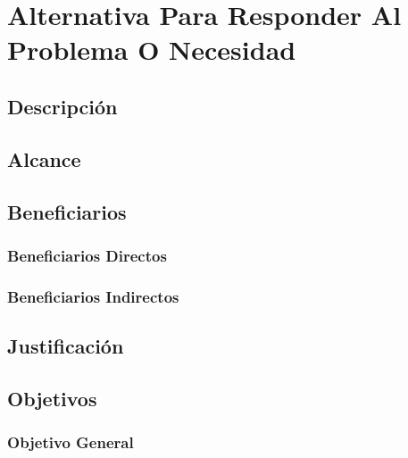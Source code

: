 \section{Alternativa Para Responder Al Problema O Necesidad}

\lipsum[1-3] %

\subsection{Descripción}
\lipsum[1-3] %

\subsection{Alcance}
\lipsum[1-2] %

\subsection{Beneficiarios}
\lipsum[1] %

\subsubsection{Beneficiarios Directos}
\lipsum[1][1-5] %

\subsubsection{Beneficiarios Indirectos}
\lipsum[1][1-5] %

\subsection{Justificación}
\lipsum[1-5] %

\subsection{Objetivos}
\subsubsection{Objetivo General}
\lipsum[1][1-5] %
